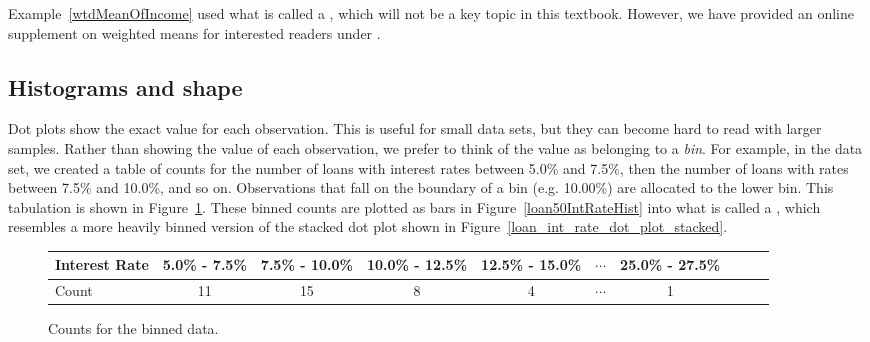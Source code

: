 
Example~\ref{wtdMeanOfIncome} used what is called
a ,
which will not be a key topic in this textbook.
However, we have provided an online supplement on
weighted means for interested readers under
.



\subsection{Histograms and shape}
\label{histogramsAndShape}

Dot plots show the exact value for each observation.
This is useful for small data sets, but they can become
hard to read with larger samples. Rather than showing the
value of each observation, we prefer to think of the value
as belonging to a \emph{bin}.
For example, in the  data set, we created
a table of counts for the number of loans with interest
rates between 5.0\% and 7.5\%, then the number of loans
with rates between 7.5\% and 10.0\%, and so on.
Observations that fall on the boundary of a bin
(e.g. 10.00\%) are allocated to the lower bin.
This tabulation is shown in Figure~\ref{binnedIntRateAmountTable}.
These binned counts are plotted as bars in
Figure~\ref{loan50IntRateHist} into what is called
a , which resembles a more heavily binned
version of the stacked dot plot shown in
Figure~\ref{loan_int_rate_dot_plot_stacked}.

\begin{figure}[ht]
\centering\small
\begin{tabular}{l ccc ccc ccc}
  \hline
  Interest Rate &
      5.0\% - 7.5\% &
      7.5\% - 10.0\% &
      10.0\% - 12.5\% &
      12.5\% - 15.0\% &
      $\cdots$ &
      25.0\% - 27.5\% \\
  \hline
  Count & 11 & 15 & 8 & 4 & $\cdots$ & 1 \\
  \hline
\end{tabular}
\caption{Counts for the binned
     data.}
\label{binnedIntRateAmountTable}
\end{figure}


